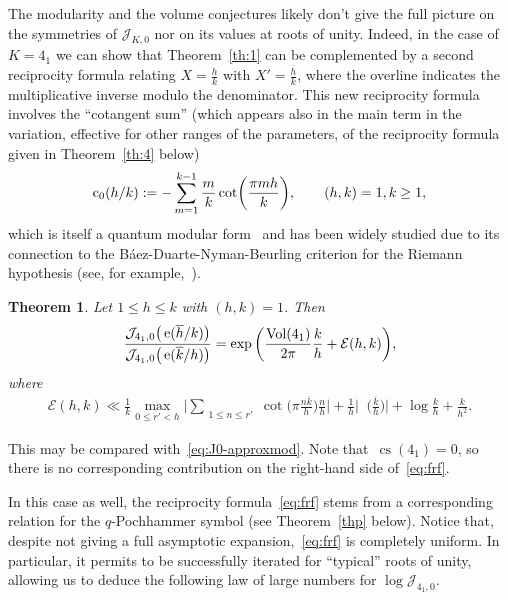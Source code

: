 \documentclass[11pt]{amsart}
\newcommand{\E}{\mathcal{E}}
\newcommand{\J}{\mathcal{J}}
\newtheorem{theo}{Theorem}
\theoremstyle{definition}
\newcommand{\ssum}[1]{\sum_{\substack{#1}}}
\newcommand{\pr}[1]{\mathchoice{\left( #1\right)}{(#1)}{(#1)}{(#1)}}
\newcommand{\e}[1][]{\ifthenelse{\equal{#1}{}}{{\rm e}}{\operatorname{e}\pr{ #1}}}
\DeclareMathOperator{\Vol}{Vol}
\DeclareMathOperator{\cs}{cs}
\DeclareMathOperator{\cz}{c_0}
\newcommand{\1}{{\mathbf 1}}
\let\originalleft\left
\let\originalright\right
\renewcommand{\left}{\mathopen{}\mathclose\bgroup\originalleft}
\renewcommand{\right}{\aftergroup\egroup\originalright}
\numberwithin{equation}{section}
\begin{document}
The modularity and the volume conjectures likely don't give the full picture on the symmetries of $\J_{K,0}$ nor on its values at roots of unity.
%
Indeed, in the case of $K=4_1$ we can show that Theorem~\ref{th:1} can be complemented by a second reciprocity formula relating $X=\frac hk$ with $X'=\frac {\overline h}k$, where the overline indicates the multiplicative inverse modulo the denominator. This new reciprocity formula involves
the ``cotangent sum'' (which appears also in the main term in the variation, effective for other ranges of the parameters, of the reciprocity formula given in Theorem~\ref{th:4} below)
\begin{equation*}
  \cz\pr{ h/k}:=-\sum_{m=1}^{k-1}\frac mk\cot\pr{\frac{\pi  mh}{k}},\qquad (h,k)=1,k\geq1,
\end{equation*}
which is itself a quantum modular form~\cite{BettinConrey2013}
and has been widely studied due to its connection to the  B\'aez-Duarte-Nyman-Beurling criterion for the Riemann hypothesis (see, for example,~\cite{Bagchi2006,Baez-Duarte2003,Baez-DuarteBalazardEtAl2005,Vasyunin1995}).
\begin{theo}\label{th:2}
  Let $1\leq h\leq k$ with $(h,k)=1$. Then
  \begin{equation}\label{eq:frf}
   \frac{\J_{4_1,0}\big(\e[{\overline{h}}/k]\big)}{\J_{4_1,0}\big(\e[{\overline{k}/}h]\big) }=\exp\bigg( \frac{\Vol(4_1)}{2\pi} \frac kh+\E( h,k)\bigg),
  \end{equation}
  where  
  \begin{align}\label{eq:ber}
    \E( h,k) \ll 
    \frac1k \max_{0\leq r' <h}\Big|\ssum{1\leq n\leq r'}\cot\Big(\pi\frac{n\overline k}h\Big)\frac{ n}{h}\Big|+\frac {1}{h}\Big|\cz\Big(\frac{\overline k}h\Big)\Big|
    +\log \frac kh+\frac{k}{h^{2}}.
  \end{align}
\end{theo}

This may be compared with~\eqref{eq:J0-approxmod}. Note that~$\cs(4_1) = 0$, so there is no corresponding contribution on the right-hand side of~\eqref{eq:frf}. 

In this case as well, the reciprocity formula~\eqref{eq:frf} stems from a corresponding relation for the $q$-Pochhammer symbol (see Theorem~\ref{thp} below). Notice that, despite not giving a full asymptotic expansion,~\eqref{eq:frf} is completely uniform. In particular, it permits to be successfully iterated for ``typical'' roots of unity, %
allowing us to deduce the following law of large numbers for $\log \J_{4_1,0}$.
\end{document}
